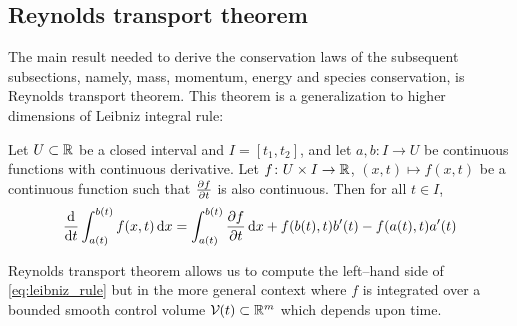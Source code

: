 
\subsection{Reynolds transport theorem}

The main result needed to derive the conservation laws of the subsequent subsections, namely, mass, momentum, energy and species conservation, is Reynolds transport theorem. This theorem is a generalization to higher dimensions of Leibniz integral rule:

\begin{theorem}
	Let $U \subset \mathbb{R}$ be a closed interval and $I = [t_1, t_2]$, and let $a, b \colon I \rightarrow U$ be continuous functions with continuous derivative. Let $f \colon U \times I \rightarrow \mathbb{R}$, $(x,t) \mapsto f(x,t)$ be a continuous function such that $\pdv{f}{t}$ is also continuous. Then for all $t \in I$,
	\begin{equation} \label{eq:leibniz_rule}
		\frac{\dd}{\dd{t}} \int_{a(t)}^{b(t)} f(x,t) \dd{x} = 
		\int_{a(t)}^{b(t)} \pdv{f}{t}(x,t) \dd{x} + f(b(t),t) b'(t) - f(a(t),t) a'(t)
	\end{equation}
\end{theorem}

\noindent
Reynolds transport theorem allows us to compute the left--hand side of \eqref{eq:leibniz_rule} but in the more general context where $f$ is integrated over a bounded smooth control volume $\mathcal{V}_{}(t) \subset \mathbb{R}^m$ which depends upon time. 


